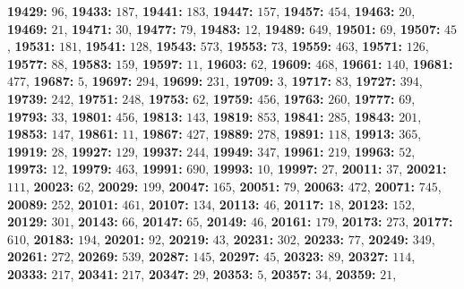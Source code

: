 \textsf{\bfseries 19429:} $96$, \textsf{\bfseries 19433:} $187$, \textsf{\bfseries 19441:} $183$, \textsf{\bfseries 19447:} $157$, \textsf{\bfseries 19457:} $454$, \textsf{\bfseries 19463:} $20$, \textsf{\bfseries 19469:} $21$, \textsf{\bfseries 19471:} $30$, \textsf{\bfseries 19477:} $79$, \textsf{\bfseries 19483:} $12$, \textsf{\bfseries 19489:} $649$, \textsf{\bfseries 19501:} $69$, \textsf{\bfseries 19507:} $45$, \textsf{\bfseries 19531:} $181$, \textsf{\bfseries 19541:} $128$, \textsf{\bfseries 19543:} $573$, \textsf{\bfseries 19553:} $73$, \textsf{\bfseries 19559:} $463$, \textsf{\bfseries 19571:} $126$, \textsf{\bfseries 19577:} $88$, \textsf{\bfseries 19583:} $159$, \textsf{\bfseries 19597:} $11$, \textsf{\bfseries 19603:} $62$, \textsf{\bfseries 19609:} $468$, \textsf{\bfseries 19661:} $140$, \textsf{\bfseries 19681:} $477$, \textsf{\bfseries 19687:} $5$, \textsf{\bfseries 19697:} $294$, \textsf{\bfseries 19699:} $231$, \textsf{\bfseries 19709:} $3$, \textsf{\bfseries 19717:} $83$, \textsf{\bfseries 19727:} $394$, \textsf{\bfseries 19739:} $242$, \textsf{\bfseries 19751:} $248$, \textsf{\bfseries 19753:} $62$, \textsf{\bfseries 19759:} $456$, \textsf{\bfseries 19763:} $260$, \textsf{\bfseries 19777:} $69$, \textsf{\bfseries 19793:} $33$, \textsf{\bfseries 19801:} $456$, \textsf{\bfseries 19813:} $143$, \textsf{\bfseries 19819:} $853$, \textsf{\bfseries 19841:} $285$, \textsf{\bfseries 19843:} $201$, \textsf{\bfseries 19853:} $147$, \textsf{\bfseries 19861:} $11$, \textsf{\bfseries 19867:} $427$, \textsf{\bfseries 19889:} $278$, \textsf{\bfseries 19891:} $118$, \textsf{\bfseries 19913:} $365$, \textsf{\bfseries 19919:} $28$, \textsf{\bfseries 19927:} $129$, \textsf{\bfseries 19937:} $244$, \textsf{\bfseries 19949:} $347$, \textsf{\bfseries 19961:} $219$, \textsf{\bfseries 19963:} $52$, \textsf{\bfseries 19973:} $12$, \textsf{\bfseries 19979:} $463$, \textsf{\bfseries 19991:} $690$, \textsf{\bfseries 19993:} $10$, \textsf{\bfseries 19997:} $27$, \textsf{\bfseries 20011:} $37$, \textsf{\bfseries 20021:} $111$, \textsf{\bfseries 20023:} $62$, \textsf{\bfseries 20029:} $199$, \textsf{\bfseries 20047:} $165$, \textsf{\bfseries 20051:} $79$, \textsf{\bfseries 20063:} $472$, \textsf{\bfseries 20071:} $745$, \textsf{\bfseries 20089:} $252$, \textsf{\bfseries 20101:} $461$, \textsf{\bfseries 20107:} $134$, \textsf{\bfseries 20113:} $46$, \textsf{\bfseries 20117:} $18$, \textsf{\bfseries 20123:} $152$, \textsf{\bfseries 20129:} $301$, \textsf{\bfseries 20143:} $66$, \textsf{\bfseries 20147:} $65$, \textsf{\bfseries 20149:} $46$, \textsf{\bfseries 20161:} $179$, \textsf{\bfseries 20173:} $273$, \textsf{\bfseries 20177:} $610$, \textsf{\bfseries 20183:} $194$, \textsf{\bfseries 20201:} $92$, \textsf{\bfseries 20219:} $43$, \textsf{\bfseries 20231:} $302$, \textsf{\bfseries 20233:} $77$, \textsf{\bfseries 20249:} $349$, \textsf{\bfseries 20261:} $272$, \textsf{\bfseries 20269:} $539$, \textsf{\bfseries 20287:} $145$, \textsf{\bfseries 20297:} $45$, \textsf{\bfseries 20323:} $89$, \textsf{\bfseries 20327:} $114$, \textsf{\bfseries 20333:} $217$, \textsf{\bfseries 20341:} $217$, \textsf{\bfseries 20347:} $29$, \textsf{\bfseries 20353:} $5$, \textsf{\bfseries 20357:} $34$, \textsf{\bfseries 20359:} $21$, 
